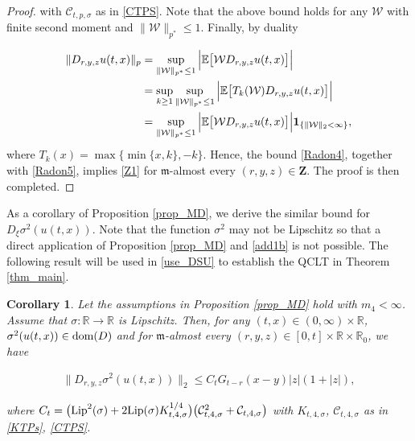 \documentclass[letterpaper, 11pt,  reqno]{amsart}
\newtheorem{corollary}[theorem]{Corollary}
\newcommand{\noi}{\noindent}
\newcommand{\R}{\mathbb{R}}
\newcommand{\W}{\mathcal{W}}
\newcommand{\E}{\mathbb{E}}
\newcommand{\s}{\sigma}
\newcommand{\ind}{\mathbf 1}
\newcommand{\fm}{\mathfrak{m}}
\newcommand{\dom}{\textup{dom}}
\numberwithin{equation}{section}
\numberwithin{theorem}{section}
\begin{document}
\begin{proof}
\noi
 with $\mathcal{C}_{t,p,\s}$ as in \eqref{CTPS}. Note that the above bound holds
 for any $\W$ with finite second moment and $\| \W\|_{p^\ast} \leq 1$.
 Finally, by duality

 
 \noi
 \begin{align}
 \| D_{r,y, z} u(t,x) \|_p 
 &= \sup_{ \| \W \|_{p^\ast}\leq 1} \Big| \E\big[ \W D_{r, y, z} u(t,x) \big]  \Big| \notag  \\
 &=  \sup_{k\geq 1} \sup_{ \| \W \|_{p^\ast}\leq 1} \Big| \E\big[ T_k(\W) D_{r, y, z} u(t,x) \big]  \Big|   \notag \\
 &=   \sup_{ \| \W \|_{p^\ast}\leq 1} \Big| \E\big[ \W D_{r, y, z} u(t,x) \big]  \Big| \ind_{\{\| \W\|_2 < \infty \}},
  \label{Radon5}
 \end{align}
where $T_k(x) =\max\{  \min\{ x, k\} , -k \}$. 
Hence, the bound \eqref{Radon4}, together with 
 \eqref{Radon5}, implies \eqref{Z1}
 for $\fm$-almost every $(r, y, z)\in\mathbf{Z}$.
 The proof is then completed. 
 \qedhere



 \end{proof}


As a corollary of Proposition  \ref{prop_MD},
we derive the similar bound for $D_\xi \s^2( u(t,x) )$.
Note that the function $\s^2$ may not be Lipschitz so that 
a direct application of Proposition  \ref{prop_MD}
and \eqref{add1b} is not possible. 
The following result will be used in \eqref{use_DSU}
to establish the  \textsf{QCLT}  in  Theorem \ref{thm_main}. 


\begin{corollary}
\label{cor_DSU}
Let the assumptions in Proposition \ref{prop_MD} hold with 
$m_4<\infty$. Assume that $\s:\R\to\R$ is Lipschitz. 
Then, for any $(t, x)\in(0, \infty) \times\R$, $\s^2(u(t,x)) \in \dom(D)$ 
and 
 for $\fm$-almost every $(r,y,z)\in [0,t] \times \R \times \R_0$,
 we have 
 
 \noi
\begin{align}
\label{Dsu}
\|D_{r,y,z} \s^2(u(t,x))\|_2 \leq C_t G_{t-r}(x-y)|z|(1+|z|) ,
\end{align}

\noi
where $C_t=\big({\rm Lip}^2(\s)+2{\rm Lip}(\s)K_{t,4,\s}^{1/4}\big)\big(\mathcal{C}_{t,4,\s}^2  +\mathcal{C}_{t,4,\s}\big)$
with $K_{t,4,\s}$, $\mathcal{C}_{t,4,\s}$ as in \eqref{KTPs}, \eqref{CTPS}.
\end{corollary}
\end{document}
